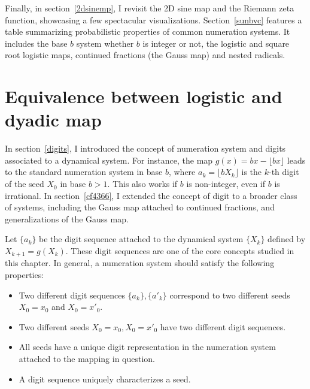 \documentclass[oneside,10pt]{book}
\begin{document}
Finally, in
section~\ref{2dsinemp}, I revisit the 2D sine map and the Riemann zeta function, showcasing a few spectacular visualizations. Section~\ref{sunbvc} features a table summarizing probabilistic properties of common numeration systems. It includes the base $b$ system whether $b$ is integer or not, the logistic and square root logistic maps, continued fractions (the Gauss map) and nested
 radicals.


\section{Equivalence between logistic and dyadic map}

In section~\ref{digits}, I introduced the concept of numeration system and digits associated to a dynamical system.
For instance, the map $g(x)=bx - \lfloor bx \rfloor$ leads to the standard numeration system in base $b$, where
 $a_k=\lfloor bX_k\rfloor$ is the $k$-th digit of the seed $X_0$ in base $b>1$.  This also works if $b$ is non-integer, even if $b$ is irrational.
In section~\ref{cf4366}, I extended the concept of \textcolor{index}{digit} to a broader class of systems, including the Gauss map attached to continued fractions, and generalizations of the Gauss map.

Let $\{a_k\}$ be the digit sequence attached to the dynamical system
$\{X_k\}$ defined by $X_{k+1}=g(X_k)$.
These digit sequences are one of the core concepts studied in this chapter.
In general, a numeration system should satisfy the following properties: \vspace{1ex}

\begin{itemize}
\item Two different digit sequences $\{a_k\}, \{a'_k\}$ correspond to two different seeds $X_0=x_0$ and $X_0=x'_0$.
\item Two different seeds $X_0=x_0,X_0=x'_0$ have two different digit sequences.
\item All seeds have a unique digit representation in the numeration system attached to the mapping in question.
\item A digit sequence uniquely characterizes a seed.
\end{itemize}\vspace{1ex}
\end{document}

